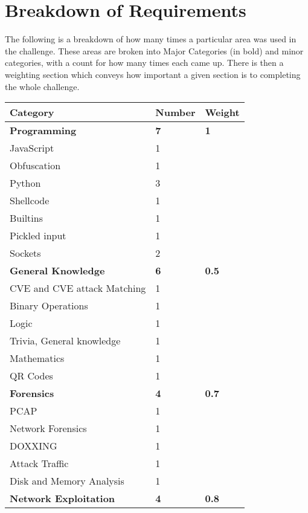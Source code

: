 \documentclass[a4paper,11pt]{report}
\begin{document}
	\section{Breakdown of Requirements}
	 	The following is a breakdown of how many times a particular area was used in the challenge. 
		These areas are broken into Major Categories (in bold) and minor categories, with a count for how many times each came up. 
		There is then a weighting section which conveys how important a given section is to completing the whole challenge. 
		\begin{table}[htb]
			\centering
			\begin{tabular}{| l | l | l |}
				\hline
				\textbf{Category} & \textbf{Number} & \textbf{Weight} \\ \hline 
				\textbf{Programming} & \textbf{7} & \textbf{1} \\ \hline
				\quad JavaScript & 1 & \\ \hline 
				\quad Obfuscation & 1 & \\ \hline
				\quad Python & 3 & \\ \hline 
				\qquad Shellcode & 1 & \\ \hline 
				\qquad Builtins & 1 & \\ \hline 
				\qquad Pickled input & 1 & \\ \hline 
				\quad Sockets & 2 & \\ \hline 
				\textbf{General Knowledge} & \textbf{6} & \textbf{0.5}\\ \hline 
				\quad CVE and CVE attack Matching & 1 & \\ \hline 
				\quad Binary Operations & 1 & \\ \hline 
				\quad Logic & 1 & \\ \hline 
				\quad Trivia, General knowledge & 1 & \\ \hline 
				\quad Mathematics & 1 & \\ \hline 
				\quad QR Codes & 1 & \\ \hline 
				\textbf{Forensics} & \textbf{4} & \textbf{0.7}\\ \hline
				\quad PCAP & 1 & \\ \hline
				\quad Network Forensics & 1 & \\ \hline 
				\quad DOXXING & 1 & \\ \hline 
				\quad Attack Traffic & 1 & \\ \hline 
				\quad Disk and Memory Analysis & 1 & \\ \hline 
				\textbf{Network Exploitation} & \textbf{4} & \textbf{0.8} \\ \hline 

\end{tabular}
\end{table}
\end{document}
